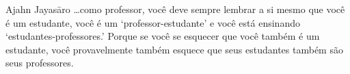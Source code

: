 
\begin{quotepage}{0.53\linewidth}{Ajahn Jayasāro}
\ldots{}como professor, você deve sempre lembrar a si mesmo que você é um
estudante, você é um ‘professor-estudante’ e você está ensinando
‘estudantes-professores.’ Porque se você se esquecer que você também é
um estudante, você provavelmente também esquece que seus estudantes
também são seus professores.
\end{quotepage}

